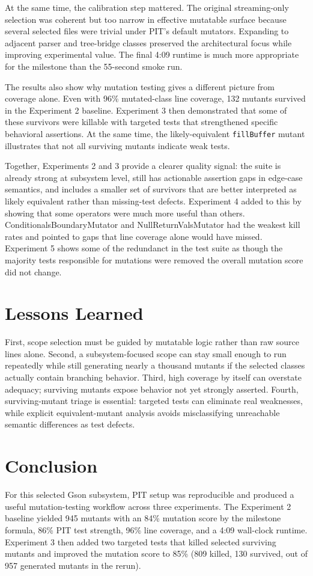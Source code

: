 \documentclass[11pt]{article}
\begin{document}
At the same time, the calibration step mattered. The original streaming-only selection was coherent but too narrow in effective mutatable surface because several selected files were trivial under PIT's default mutators. Expanding to adjacent parser and tree-bridge classes preserved the architectural focus while improving experimental value. The final 4:09 runtime is much more appropriate for the milestone than the 55-second smoke run.

The results also show why mutation testing gives a different picture from coverage alone. Even with 96\% mutated-class line coverage, 132 mutants survived in the Experiment 2 baseline. Experiment 3 then demonstrated that some of these survivors were killable with targeted tests that strengthened specific behavioral assertions. At the same time, the likely-equivalent \texttt{fillBuffer} mutant illustrates that not all surviving mutants indicate weak tests.

Together, Experiments 2 and 3 provide a clearer quality signal: the suite is already strong at subsystem level, still has actionable assertion gaps in edge-case semantics, and includes a smaller set of survivors that are better interpreted as likely equivalent rather than missing-test defects. Experiment 4 added to this by showing that some operators were much more useful than others. ConditionalsBoundaryMutator and NullReturnValsMutator had the weakest kill rates and pointed to gaps that line coverage alone would have missed. Experiment 5 shows some of the redundanct in the test suite as though the majority tests responsible for mutations were removed the overall mutation score did not change.

\section{Lessons Learned}
First, scope selection must be guided by mutatable logic rather than raw source lines alone. Second, a subsystem-focused scope can stay small enough to run repeatedly while still generating nearly a thousand mutants if the selected classes actually contain branching behavior. Third, high coverage by itself can overstate adequacy; surviving mutants expose behavior not yet strongly asserted. Fourth, surviving-mutant triage is essential: targeted tests can eliminate real weaknesses, while explicit equivalent-mutant analysis avoids misclassifying unreachable semantic differences as test defects.

\section{Conclusion}
For this selected Gson subsystem, PIT setup was reproducible and produced a useful mutation-testing workflow across three experiments. The Experiment 2 baseline yielded 945 mutants with an 84\% mutation score by the milestone formula, 86\% PIT test strength, 96\% line coverage, and a 4:09 wall-clock runtime. Experiment 3 then added two targeted tests that killed selected surviving mutants and improved the mutation score to 85\% (809 killed, 130 survived, out of 957 generated mutants in the rerun).
\end{document}
